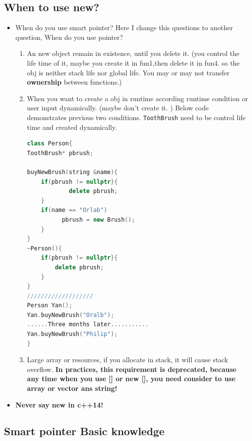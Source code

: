\documentclass[a4paper,12pt,twoside]{book}
\begin{document}
\subsection{When to use new?}
\begin{itemize}

\item When do you use smart pointer? Here I change this questions to another question, When do you use pointer?
\begin{enumerate}

\item An new object remain in existence, until you delete it. (you control the life time of it, maybe you create it in fun1,then delete it in fun4. so the obj is neither stack life nor global life. You may or may not transfer \textbf{ownership} between functions.)

\item When you want to create a obj in runtime according runtime condition or user input dynamically. (maybe don't create it. ) Below code demonstrates previous two conditions.  \texttt{ToothBrush} need to be control life time and created dynamically.

\begin{lstlisting}[frame=single, language=c++]
class Person{
ToothBrush* pbrush;

buyNewBrush(string &name){
    if(pbrush != nullptr}{
	    	delete pbrush;
    }
    if(name == "Orlab")
          pbrush = new Brush();
    }
}
~Person(){
	if(pbrush != nullptr}{
		delete pbrush;
    }
}
///////////////////
Person Yan();
Yan.buyNewBrush("Oralb");
......Three months later...........
Yan.buyNewBrush("Philip");
}
\end{lstlisting}

\item Large array or resources,  if you allocate in stack, it will cause stack overflow. \textbf{In practices, this requirement is deprecated, because any time when you use [] or new [], you need consider to use array or vector ans string!}
\end{enumerate}

\item \textbf{Never say new in c++14!} 
\end{itemize}


\subsection{Smart pointer Basic knowledge}
\end{document}
